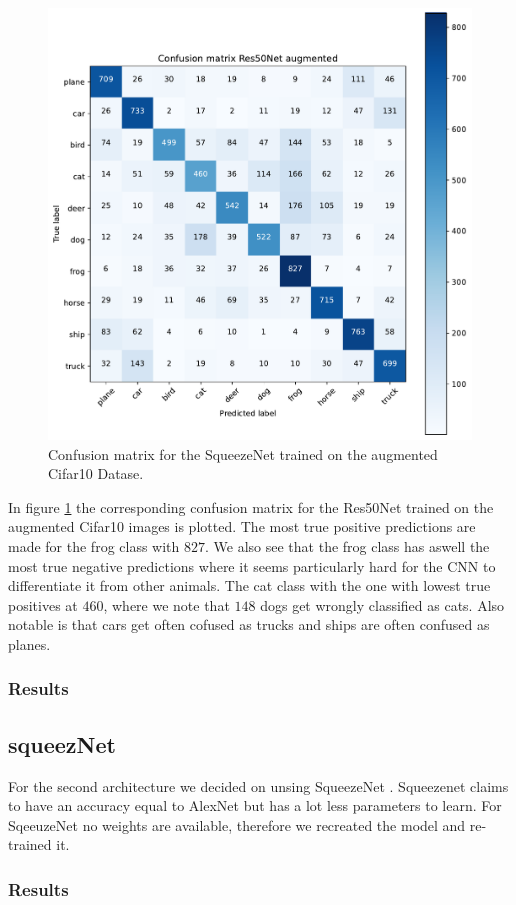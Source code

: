 \documentclass[11pt]{article}
\begin{document}
\begin{figure}
\centering
\includegraphics[width=0.5\columnwidth]{res50Net_cifar10_aug_confmat.pdf}
\caption{Confusion matrix for the SqueezeNet trained on the augmented Cifar10 Datase.}
\label{rescnn::4}
\end{figure}

In figure \ref{rescnn::4} the corresponding confusion matrix for the Res50Net trained on the augmented Cifar10 images is plotted. The most true positive predictions are made for the frog class with $827$. We also see that the frog class has aswell the most true negative predictions where it seems particularly hard for the CNN to differentiate it from other animals. The cat class with the one with lowest true positives at $460$, where we note that $148$ dogs get wrongly classified as cats. Also notable is that cars get often cofused as trucks and ships are often confused as planes. 


\subsubsection{Results}

  


\subsection{squeezNet}
For the second architecture we decided on unsing SqueezeNet \cite{iandola2016}. Squeezenet claims to have an accuracy equal to AlexNet but has a lot less parameters to learn.  
For SqeeuzeNet no weights are available, therefore we recreated the model and re-trained it. 



\subsubsection{Results}

\newpage


\end{document}
